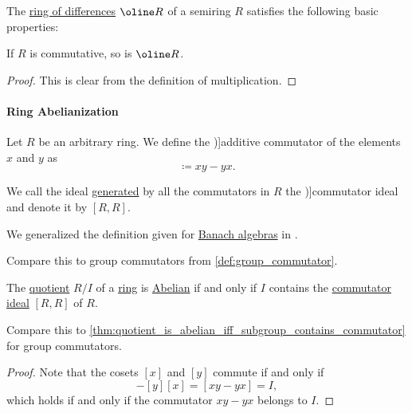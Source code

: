 \begin{proposition}\label{thm:def:ring_of_differences}
  The \hyperref[def:ring_of_differences]{ring of differences} \( \oline R \) of a semiring \( R \) satisfies the following basic properties:
  \begin{thmenum}
     If \( R \) is commutative, so is \( \oline R \).
  \end{thmenum}
\end{proposition}
\begin{proof}
   This is clear from the definition of multiplication.
\end{proof}

\paragraph{Ring Abelianization}

\begin{definition}\label{def:ring_commutator}\mimprovised
  Let \( R \) be an arbitrary ring. We define the \term[en=additive commutator (\cite[145]{Kaplansky1974CommutativeRings})]{additive commutator} of the elements \( x \) and \( y \) as
  \begin{equation*}
    [x, y] \coloneqq xy - yx.
  \end{equation*}

  We call the ideal \hyperref[def:semiring_ideal/generated]{generated} by all the commutators in \( R \) the \term[en=commutator ideal (in Banach algebra) (\cite[222]{Conway1997FunctionalAnalysis})]{commutator ideal} and denote it by \( [R, R] \).
\end{definition}
\begin{comments}
  \item We generalized the definition given for \hyperref[def:banach_algebra]{Banach algebras} in \cite[222]{Conway1997FunctionalAnalysis}.

  \item Compare this to group commutators from \cref{def:group_commutator}.
\end{comments}

\begin{proposition}\label{thm:quotient_is_abelian_iff_ideal_contains_commutator}
  The \hyperref[def:ring/quotient]{quotient} \( R / I \) of a \hyperref[def:ring]{ring} is \hyperref[def:abelian_group]{Abelian} if and only if \( I \) contains the \hyperref[def:ring_commutator]{commutator ideal} \( [R, R] \) of \( R \).
\end{proposition}
\begin{comments}
  \item Compare this to \cref{thm:quotient_is_abelian_iff_subgroup_contains_commutator} for group commutators.
\end{comments}
\begin{proof}
  Note that the cosets \( [x] \) and \( [y] \) commute if and only if
  \begin{equation*}
    [x] [y] - [y] [x] = [xy - yx] = I,
  \end{equation*}
  which holds if and only if the commutator \( xy - yx \) belongs to \( I \).
\end{proof}

